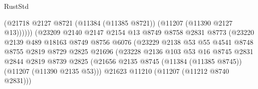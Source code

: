 \begin{lexlean}{RustStd}
\begin{coremodule}
                                            (@21718
                                              @2127
                                              @8721
                                              (@11384 (@11385 @8721))
                                              (@11207 (@11390 @2127 @13))))))
                                      (@23209
                                        @2140
                                        @2147
                                        @2154
                                        @13
                                        @8749
                                        @8758
                                        @2831
                                        @8773
                                        (@23220
                                          @2139
                                          @489
                                          @18163
                                          @8749
                                          @8756
                                          @6076
                                          (@23229
                                            @2138
                                            @53
                                            @55
                                            @4541
                                            @8748
                                            @8755
                                            @2819
                                            @8729
                                            @2825
                                            @21696
                                            (@23228
                                              @2136
                                              @103
                                              @53
                                              @16
                                              @8745
                                              @2831
                                              @2844
                                              @2819
                                              @8739
                                              @2825
                                              (@21656
                                                @2135
                                                @8745
                                                (@11384 (@11385 @8745))
                                                (@11207 (@11390 @2135 @53)))
                                              @21623
                                              @11210
                                              (@11207 (@11212 @8740 @2831)))

\end{coremodule}
\end{lexlean}
